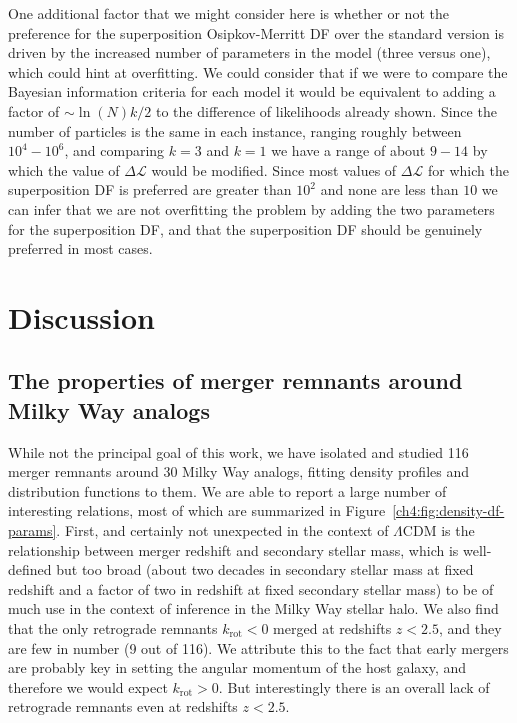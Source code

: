 One additional factor that we might consider here is whether or not the preference for the superposition Osipkov-Merritt DF over the standard version is driven by the increased number of parameters in the model (three versus one), which could hint at overfitting. We could consider that if we were to compare the Bayesian information criteria for each model it would be equivalent to adding a factor of $\sim \ln(N) k / 2$ to the difference of likelihoods already shown. Since the number of particles is the same in each instance, ranging roughly between $10^{4}-10^{6}$, and comparing $k=3$ and $k=1$ we have a range of about $9-14$ by which the value of $\Delta \mathcal{L}$ would be modified. Since most values of $\Delta \mathcal{L}$ for which the superposition DF is preferred are greater than $10^{2}$ and none are less than $10$ we can infer that we are not overfitting the problem by adding the two parameters for the superposition DF, and that the superposition DF should be genuinely preferred in most cases.

\section{Discussion}
\label{ch4:sec:discussion}

\subsection{The properties of merger remnants around Milky Way analogs}

While not the principal goal of this work, we have isolated and studied 116 merger remnants around 30 Milky Way analogs, fitting density profiles and distribution functions to them. We are able to report a large number of interesting relations, most of which are summarized in Figure~\ref{ch4:fig:density-df-params}. First, and certainly not unexpected in the context of $\Lambda$CDM is the relationship between merger redshift and secondary stellar mass, which is well-defined but too broad (about two decades in secondary stellar mass at fixed redshift and a factor of two in redshift at fixed secondary stellar mass) to be of much use in the context of inference in the Milky Way stellar halo. We also find that the only retrograde remnants $k_\mathrm{rot} < 0$ merged at redshifts $z<2.5$, and they are few in number (9 out of 116). We attribute this to the fact that early mergers are probably key in setting the angular momentum of the host galaxy, and therefore we would expect $k_\mathrm{rot} > 0$. But interestingly there is an overall lack of retrograde remnants even at redshifts $z<2.5$.


